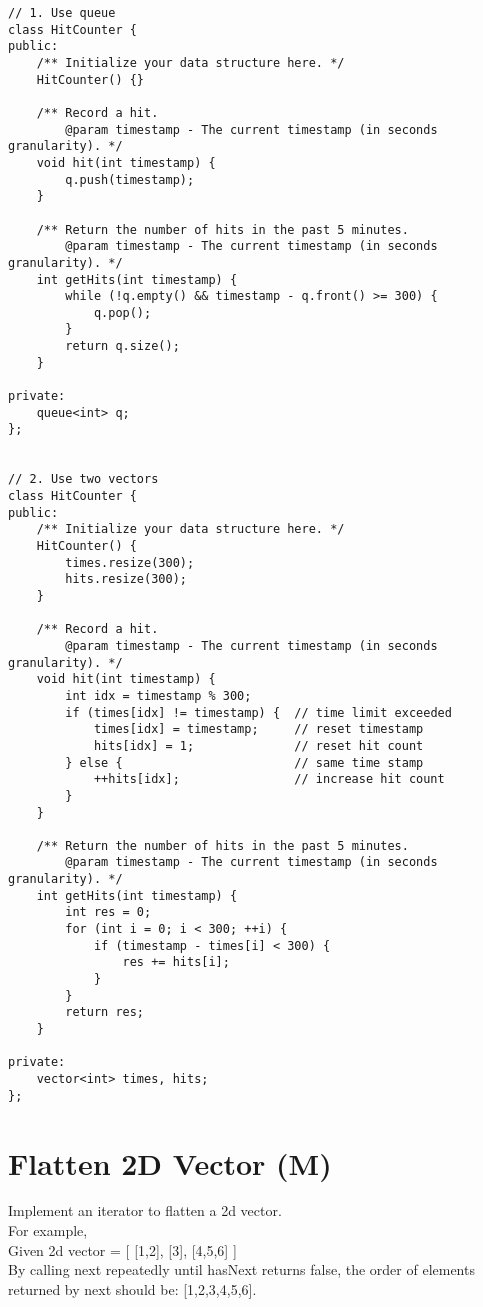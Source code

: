\begin{lstlisting}
// 1. Use queue
class HitCounter {
public:
    /** Initialize your data structure here. */
    HitCounter() {}
    
    /** Record a hit.
        @param timestamp - The current timestamp (in seconds granularity). */
    void hit(int timestamp) {
        q.push(timestamp);
    }
    
    /** Return the number of hits in the past 5 minutes.
        @param timestamp - The current timestamp (in seconds granularity). */
    int getHits(int timestamp) {
        while (!q.empty() && timestamp - q.front() >= 300) {
            q.pop();
        }
        return q.size();
    }

private:
    queue<int> q;
};


// 2. Use two vectors
class HitCounter {
public:
    /** Initialize your data structure here. */
    HitCounter() {
        times.resize(300); 
        hits.resize(300);
    }
    
    /** Record a hit.
        @param timestamp - The current timestamp (in seconds granularity). */
    void hit(int timestamp) {
        int idx = timestamp % 300;
        if (times[idx] != timestamp) {  // time limit exceeded
            times[idx] = timestamp;     // reset timestamp
            hits[idx] = 1;              // reset hit count
        } else {                        // same time stamp
            ++hits[idx];                // increase hit count
        }
    }
    
    /** Return the number of hits in the past 5 minutes.
        @param timestamp - The current timestamp (in seconds granularity). */
    int getHits(int timestamp) {
        int res = 0;
        for (int i = 0; i < 300; ++i) {
            if (timestamp - times[i] < 300) {
                res += hits[i];
            }
        }
        return res;
    }

private:
    vector<int> times, hits;
};
\end{lstlisting}


\section{Flatten 2D Vector (M)}
Implement an iterator to flatten a 2d vector. \\

For example, \\
Given 2d vector =
[
  [1,2],
  [3],
  [4,5,6]
]\\
By calling next repeatedly until hasNext returns false, the order of elements returned by next should be: [1,2,3,4,5,6].\\

